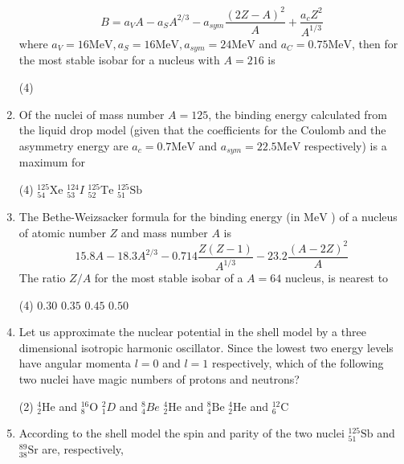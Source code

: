 \begin{enumerate}
	$$
	B=a_V A-a_S A^{2 / 3}-a_{s y m} \frac{(2 Z-A)^2}{A}+\frac{a_c Z^2}{A^{1 / 3}}
	$$
	where $a_V=16 \mathrm{MeV}, a_S=16 \mathrm{MeV}, a_{s y m}=24 \mathrm{MeV}$ and $a_C=0.75 \mathrm{MeV}$, then for the most stable isobar for a nucleus with $A=216$ is
	{}
 \begin{tasks}(4)
\end{tasks}
	\item  Of the nuclei of mass number $A=125$, the binding energy calculated from the liquid drop model (given that the coefficients for the Coulomb and the asymmetry energy are $a_c=0.7 \mathrm{MeV}$ and $a_{s y m}=22.5 \mathrm{MeV}$ respectively) is a maximum for
	{}
 \begin{tasks}(4)
	\task[\textbf{a.}]${ }_{54}^{125} \mathrm{Xe}$
	\task[\textbf{b.}]${ }_{53}^{124} I$
	\task[\textbf{c.}]${ }_{52}^{125} \mathrm{Te}$
	\task[\textbf{d.}]  ${ }_{51}^{125} \mathrm{Sb}$
\end{tasks}
	\item  The Bethe-Weizsacker formula for the binding energy (in $\mathrm{MeV}$ ) of a nucleus of atomic number $Z$ and mass number $A$ is
	$$
	15.8 A-18.3 A^{2 / 3}-0.714 \frac{Z(Z-1)}{A^{1 / 3}}-23.2 \frac{(A-2 Z)^2}{A}
	$$
	The ratio $Z / A$ for the most stable isobar of a $A=64$ nucleus, is nearest to
	 \begin{tasks}(4)
		\task[\textbf{a.}]$0.30$
		\task[\textbf{b.}] $0.35$
		\task[\textbf{c.}]$0.45$
		\task[\textbf{d.}]$0.50$ 
	\end{tasks}
	\item  Let us approximate the nuclear potential in the shell model by a three dimensional isotropic harmonic oscillator. Since the lowest two energy levels have angular momenta $l=0$ and $l=1$ respectively, which of the following two nuclei have magic numbers of protons and neutrons?
	{}
	 \begin{tasks}(2)
		\task[\textbf{a.}]${ }_2^4 \mathrm{He}$ and ${ }_8^{16} \mathrm{O}$
		\task[\textbf{b.}]${ }_1^2 D$ and ${ }_4^8 B e$
		\task[\textbf{c.}]${ }_2^4 \mathrm{He}$ and ${ }_4^8 \mathrm{Be}$
		\task[\textbf{d.}] ${ }_2^4 \mathrm{He}$ and ${ }_6^{12} \mathrm{C}$
	\end{tasks}
	\item  According to the shell model the spin and parity of the two nuclei ${ }_{51}^{125} \mathrm{Sb}$ and ${ }_{38}^{89} \mathrm{Sr}$ are, respectively,

\end{enumerate}
